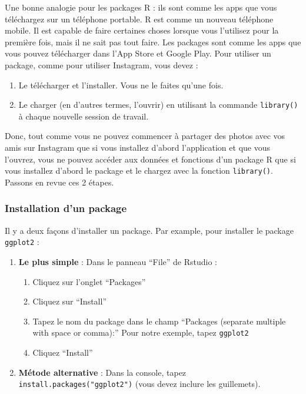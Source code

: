 \documentclass[a4paperpaper,]{article}
\providecommand{\tightlist}{%
  \setlength{\itemsep}{0pt}\setlength{\parskip}{0pt}}
\begin{document}
Une bonne analogie pour les packages R : ils sont comme les apps que vous téléchargez sur un téléphone portable. R est comme un nouveau téléphone mobile. Il est capable de faire certaines choses lorsque vous l'utilisez pour la première fois, mais il ne sait pas tout faire. Les packages sont comme les apps que vous pouvez télécharger dans l'App Store et Google Play. Pour utiliser un package, comme pour utiliser Instagram, vous devez :

\begin{enumerate}
\def\labelenumi{\arabic{enumi}.}
\tightlist
\item
  Le télécharger et l'installer. Vous ne le faites qu'une fois.
\item
  Le charger (en d'autres termes, l'ouvrir) en utilisant la commande \texttt{library()} à chaque nouvelle session de travail.
\end{enumerate}

Donc, tout comme vous ne pouvez commencer à partager des photos avec vos amis sur Instagram que si vous installez d'abord l'application et que vous l'ouvrez, vous ne pouvez accéder aux données et fonctions d'un package R que si vous installez d'abord le package et le chargez avec la fonction \texttt{library()}. Passons en revue ces 2 étapes.

\hypertarget{installation-dun-package}{%
\subsubsection{Installation d'un package}\label{installation-dun-package}}

Il y a deux façons d'installer un package. Par example, pour installer le package \texttt{ggplot2} :

\begin{enumerate}
\def\labelenumi{\arabic{enumi}.}
\tightlist
\item
  \textbf{Le plus simple} : Dans le panneau ``File'' de Rstudio :

  \begin{enumerate}
  \def\labelenumii{\alph{enumii})}
  \tightlist
  \item
    Cliquez sur l'onglet ``Packages''
  \item
    Cliquez sur ``Install''
  \item
    Tapez le nom du package dans le champ ``Packages (separate multiple with space or comma):'' Pour notre exemple, tapez \texttt{ggplot2}
  \item
    Cliquez ``Install''
  \end{enumerate}
\item
  \textbf{Métode alternative} : Dans la console, tapez \texttt{install.packages("ggplot2")} (vous devez inclure les guillemets).
\end{enumerate}
\end{document}
